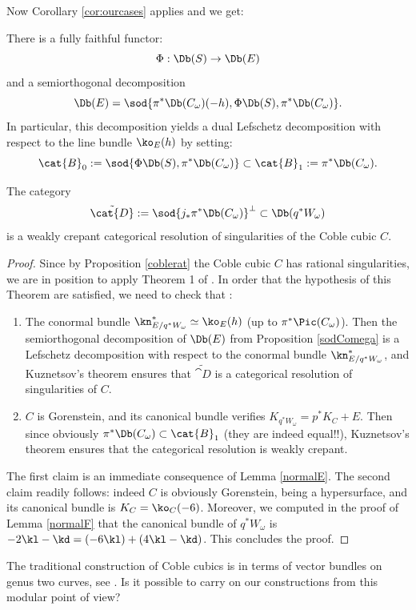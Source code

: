 Now Corollary \ref{cor:ourcases} applies and we get:

\begin{prop}\label{sodComega}
There is a fully faithful functor:
\[
\Phi: \Db(S) \to \Db(E)
\]
and a semiorthogonal decomposition
\[
\Db(E) = \sod{\pi^*\Db(C_\omega)(-h),\Phi\Db(S),\pi^* \Db(C_\omega)}.
\]
In particular, this decomposition yields a dual Lefschetz decomposition with respect to the line
bundle $\ko_E(h)$ by setting:
\[
\cat{B}_0:=\sod{\Phi\Db(S),\pi^*\Db(C_\omega)} \subset \cat{B}_{1}:=\pi^*\Db(C_\omega).
\]
\end{prop}

\begin{theorem}\label{weakly-crepant}
The category
\[
\tilde{\cat{D}}:= \sod{j_*\pi^* \Db(C_\omega)}^\perp \subset \Db(q^*W_\omega)
\]
is a weakly crepant categorical resolution of singularities of the Coble cubic $C$.
\end{theorem}

\begin{proof}
Since by Proposition \ref{coblerat} the Coble cubic $C$ has rational singularities, we are
in position to apply Theorem 1 of \cite{kuz-lefschetz}. In order that the hypothesis of
this Theorem are satisfied, we need to check that :
\begin{enumerate}
\item The conormal bundle $\kn_{E/q^* W_\omega}^*\simeq \ko_E(h)$
(up to $\pi^*\Pic(C_\omega)$). Then the semiorthogonal decomposition of $\Db(E)$ from Proposition \ref{sodComega} is a Lefschetz decomposition with respect to the conormal bundle $\kn_{E/q^*W_\omega}^*$, and Kuznetsov's theorem ensures
that $\tilde{\cat{D}}$ is a categorical resolution
of singularities of $C$.
\item $C$ is Gorenstein, and its canonical bundle verifies $K_{q^*W_\omega}=p^*K_C + E$. Then
since obviously $\pi^* \Db(C_\omega) \subset\cat{B}_1$ (they are indeed equal!!),
Kuznetsov's theorem ensures that the categorical resolution is weakly crepant.
\end{enumerate}
The first claim is an immediate consequence of Lemma \ref{normalE}.
The second claim readily follows: indeed
$C$ is obviously Gorenstein, being a hypersurface, and its
canonical bundle is $K_C=\ko_C(-6)$. Moreover, we computed in the proof of Lemma
\ref{normalF} that the canonical bundle of $q^*W_\omega$ is $-2\kl-\kd=(-6\kl)+(4\kl-\kd)$.
This concludes the proof.
\end{proof}

\begin{question*}
The traditional construction of Coble cubics is in terms of
vector bundles on genus two curves, see \cite{beauville-coble}. Is it possible to carry on our constructions
from this modular point of view?
\end{question*}

